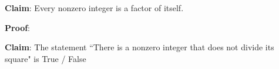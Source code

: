 
{\bf Claim}: Every nonzero integer is a factor of itself.

{\bf Proof}: 


\vspace{150pt}


{\bf Claim}: The statement ``There is a nonzero integer that does not divide its square" is True / False \\



\vspace{150pt}
